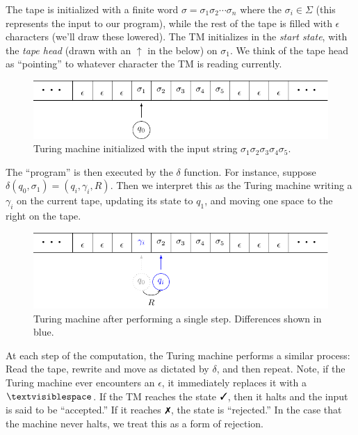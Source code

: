 \documentclass{fkpaper}
\newcommand{\blank}{\textvisiblespace}
\begin{document}
\begin{multicols}{2}
  The tape is initialized with a finite word $\sigma = \sigma_1 \sigma_2
  \cdots \sigma_n$ where the $\sigma_i \in \Sigma$ (this represents the
  input to our program), while the rest of the tape is filled with
  $\epsilon$ characters (we'll draw these lowered). The TM initializes
  in the \emph{start state}, with the \emph{tape head} (drawn with an
  $\uparrow$ in the below) on $\sigma_1$. We think of the tape head as
  ``pointing'' to whatever character the TM is reading currently.
  \begin{figure}[H]
    \centering
    \includegraphics[scale=.7]{figures/tm-initial-input.pdf}
    \caption{Turing machine initialized with the input string $\sigma_1
      \sigma_2 \sigma_3 \sigma_4 \sigma_5$.}
  \end{figure}
  The ``program'' is then executed by the $\delta$ function. For
  instance, suppose $\delta(q_0, \sigma_1) = (q_i, \gamma_i, R)$. Then
  we interpret this as the Turing machine writing a $\gamma_i$ on the
  current tape, updating its state to $q_1$, and moving one space to the
  right on the tape.
  \begin{figure}[H]
    \centering
    \includegraphics[scale=.7]{figures/tm-one-step-later.pdf}
    \caption{Turing machine after performing a single step. Differences
      shown in {\color{blue} blue}.}
  \end{figure}
  At each step of the computation, the Turing machine performs a
  similar process: Read the tape, rewrite and move as dictated by
  $\delta$, and then repeat. Note, if the Turing machine ever
  encounters an $\epsilon$, it immediately replaces it with a
  $\blank$. If the TM reaches the state $\cmark$, then it halts and
  the input is said to be ``accepted.'' If it reaches $\xmark$, the
  state is ``rejected.'' In the case that the machine never halts, we
  treat this as a form of rejection.


\end{multicols}
\end{document}
